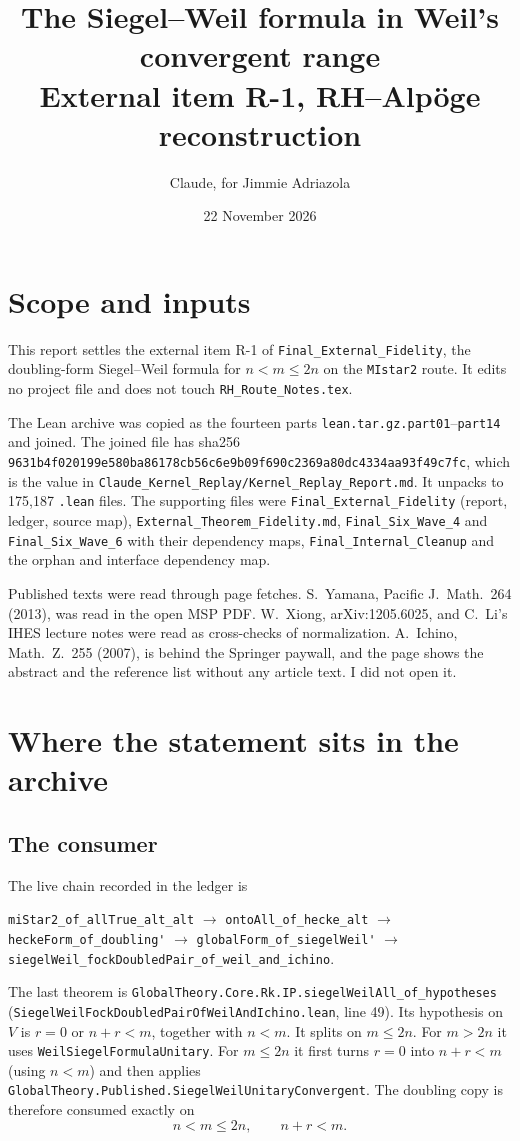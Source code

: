\documentclass[11pt]{article}
\title{The Siegel--Weil formula in Weil's convergent range\\[2pt]\large External item R-1, RH--Alpöge reconstruction}
\author{Claude, for Jimmie Adriazola}
\date{22 November 2026}
\newcommand{\lean}[1]{\nolinkurl{#1}}
\theoremstyle{definition}
\begin{document}
\maketitle

\section{Scope and inputs}

This report settles the external item R-1 of \texttt{Final\_External\_Fidelity}, the doubling-form Siegel--Weil formula for $n<m\le 2n$ on the \lean{MIstar2} route. It edits no project file and does not touch \texttt{RH\_Route\_Notes.tex}.

The Lean archive was copied as the fourteen parts \texttt{lean.tar.gz.part01}--\texttt{part14} and joined. The joined file has sha256 \texttt{9631b4f020199e580ba86178cb56c6e9b09f690c2369a80dc4334aa93f49c7fc}, which is the value in \texttt{Claude\_Kernel\_Replay/Kernel\_Replay\_Report.md}. It unpacks to 175{,}187 \texttt{.lean} files. The supporting files were \texttt{Final\_External\_Fidelity} (report, ledger, source map), \texttt{External\_Theorem\_Fidelity.md}, \texttt{Final\_Six\_Wave\_4} and \texttt{Final\_Six\_Wave\_6} with their dependency maps, \texttt{Final\_Internal\_Cleanup} and the orphan and interface dependency map.

Published texts were read through page fetches. S.~Yamana, Pacific J.\ Math.\ 264 (2013), was read in the open MSP PDF. W.~Xiong, arXiv:1205.6025, and C.~Li's IHES lecture notes were read as cross-checks of normalization. A.~Ichino, Math.\ Z.\ 255 (2007), is behind the Springer paywall, and the page shows the abstract and the reference list without any article text. I did not open it.

\section{Where the statement sits in the archive}\label{sec:where}

\subsection{The consumer}

The live chain recorded in the ledger is
\begin{center}
\lean{miStar2_of_allTrue_alt_alt} $\to$ \lean{ontoAll_of_hecke_alt} $\to$ \lean{heckeForm_of_doubling'} $\to$ \lean{globalForm_of_siegelWeil'} $\to$ \lean{siegelWeil_fockDoubledPair_of_weil_and_ichino}.
\end{center}
The last theorem is \lean{GlobalTheory.Core.Rk.IP.siegelWeilAll_of_hypotheses} (\lean{SiegelWeilFockDoubledPairOfWeilAndIchino.lean}, line 49). Its hypothesis on $V$ is $r=0$ or $n+r<m$, together with $n<m$. It splits on $m\le 2n$. For $m>2n$ it uses \lean{WeilSiegelFormulaUnitary}. For $m\le 2n$ it first turns $r=0$ into $n+r<m$ (using $n<m$) and then applies \lean{GlobalTheory.Published.SiegelWeilUnitaryConvergent}. The doubling copy is therefore consumed exactly on
\begin{equation}\label{eq:range}
n<m\le 2n,\qquad n+r<m .
\end{equation}
\end{document}
